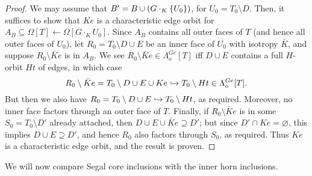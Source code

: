\documentclass[a4paper,10pt,draft]{article}%
\numberwithin{equation}{section}%
\numberwithin{figure}{section}
\begin{document}
\begin{proof}
      We may assume that $B' = B \cup (G\cdot_K \left\{U_0\right\})$, for $U_0 = T_0 \setminus D$.
      Then, it suffices to show that $K e$ is a characteristic edge orbit for
      $A_B \subseteq \Omega[T] \leftarrow \Omega[G \cdot_K U_0]$.
      Since $A_B$ contains all outer faces of $T$ (and hence all outer faces of $U_0$),
      let $R_0 = T_0 \setminus D \cup E$ be an inner face of $U_0$ with isotropy $\bar K$, and suppose
      $R_0 \setminus \bar K e$ is in $A_B$.
      We see $R_0 \setminus \bar K e \in \Lambda^{G e}_o[T]$ iff $D \cup E$ contains a full $H$-orbit $H t$ of edges, in which case
      \begin{equation}
            R_0 \setminus \bar K e = T_0 \setminus D \cup E \cup K e
            \hookrightarrow
            T_0 \setminus H t \in \Lambda^{G e}_o[T].
      \end{equation}
      But then we also have $R_0 = T_0 \setminus D \cup E \hookrightarrow T_0 \setminus H t$, as required.
      Moreover, no inner face factors through an outer face of $T$.
      Finally, if $R_0 \setminus \bar K e$ is in some $S_0 = T_0 \setminus D'$ already attached, then
      $D \cup E \cup \bar K e \supseteq D'$;
      but since $D' \cap K e = \varnothing$, this implies
      $D \cup E \supseteq D'$, and hence $R_0$ also factors through $S_0$, as required.
      Thus $K e$ is a characteristic edge orbit, and the result is proven.
\end{proof}



We will now compare Segal core inclusions with the inner horn inclusions.
\end{document}
